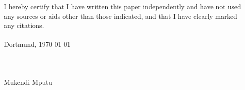 \cleardoublepage{}
\normalsize
I hereby certify that I have written this paper independently and have not used any sources or aids other than those indicated, and that I have clearly marked any citations.\\\\
Dortmund, \today \\\\\\\\
Mukendi Mputu
